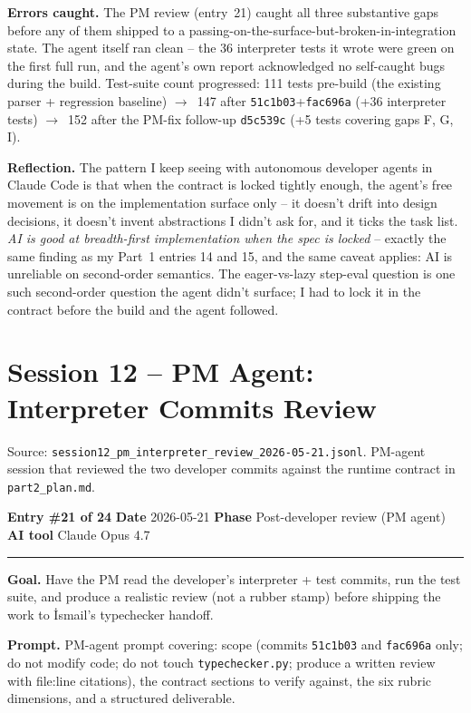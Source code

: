 \documentclass[11pt,a4paper]{article}
\newcommand{\entryheader}[4]{%
    \par\vspace{1em}\noindent\textbf{Entry \#{#1}} \textbullet{} \textbf{Date} #2 \textbullet{} \textbf{Phase} #3 \textbullet{} \textbf{AI tool} #4 \par\vspace{0.3em}\noindent\rule{\textwidth}{0.4pt}\par\vspace{0.3em}}
\newcommand{\field}[1]{\noindent\textbf{#1}}
\begin{document}
\field{Errors caught.} The PM review (entry~21) caught all three
substantive gaps before any of them shipped to a
passing-on-the-surface-but-broken-in-integration state. The agent
itself ran clean -- the 36 interpreter tests it wrote were green on
the first full run, and the agent's own report acknowledged no
self-caught bugs during the build. Test-suite count progressed:
111 tests pre-build (the existing parser + regression baseline)
$\to$~147 after \texttt{51c1b03}+\texttt{fac696a} (+36 interpreter
tests) $\to$~152 after the PM-fix follow-up \texttt{d5c539c}
(+5 tests covering gaps F, G, I).

\field{Reflection.} The pattern I keep seeing with autonomous developer
agents in Claude Code is that when the contract is locked tightly
enough, the agent's free movement is on the implementation surface
only -- it doesn't drift into design decisions, it doesn't invent
abstractions I didn't ask for, and it ticks the task list. \emph{AI
is good at breadth-first implementation when the spec is locked} --
exactly the same finding as my Part~1 entries 14 and 15, and the same
caveat applies: AI is unreliable on second-order semantics. The
eager-vs-lazy step-eval question is one such second-order question
the agent didn't surface; I had to lock it in the contract before the
build and the agent followed.


\section{Session 12 -- PM Agent: Interpreter Commits Review}

Source: \texttt{session12\_pm\_interpreter\_review\_2026-05-21.jsonl}.
PM-agent session that reviewed the two developer commits against the
runtime contract in \texttt{part2\_plan.md}.

\entryheader{21 of 24}{2026-05-21}{Post-developer review (PM agent)}{Claude Opus 4.7}

\field{Goal.} Have the PM read the developer's interpreter + test
commits, run the test suite, and produce a realistic review (not a
rubber stamp) before shipping the work to İsmail's typechecker handoff.

\field{Prompt.} PM-agent prompt covering: scope (commits \texttt{51c1b03}
and \texttt{fac696a} only; do not modify code; do not touch
\texttt{typechecker.py}; produce a written review with file:line
citations), the contract sections to verify against, the six rubric
dimensions, and a structured deliverable.
\end{document}
